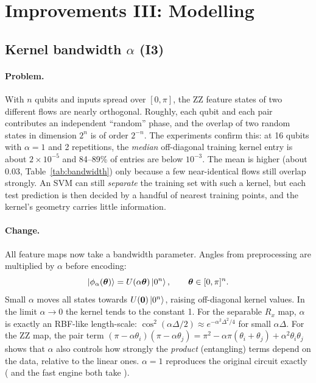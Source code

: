 \section{Improvements III: Modelling}
\label{sec:impmodel}

\subsection{Kernel bandwidth $\alpha$ (I3)}
\paragraph{Problem.} With $n$ qubits and inputs spread over $[0,\pi]$, the ZZ feature states of two
different flows are nearly orthogonal. Roughly, each qubit and each pair contributes an
independent ``random'' phase, and the overlap of two random states in dimension $2^n$ is of order
$2^{-n}$. The experiments confirm this: at 16 qubits with $\alpha=1$ and 2 repetitions, the
\emph{median} off-diagonal training kernel entry is about $2\times10^{-5}$ and 84--89\% of entries
are below $10^{-3}$. The mean is higher (about 0.03, Table~\ref{tab:bandwidth}) only because a
few near-identical flows still overlap strongly. An SVM can still
\emph{separate} the training set with such a kernel, but each test prediction is then decided by
a handful of nearest training points, and the kernel's geometry carries little information.

\paragraph{Change.} All feature maps now take a bandwidth parameter. Angles from preprocessing
are multiplied by $\alpha$ before encoding:
\begin{equation}
\left|\phi_\alpha(\bm\theta)\right\rangle=U(\alpha\bm\theta)\left|0^n\right\rangle,\qquad \bm\theta\in[0,\pi]^n .
\end{equation}
Small $\alpha$ moves all states towards $U(\bm 0)\left|0^n\right\rangle$, raising off-diagonal kernel values.
In the limit $\alpha\to0$ the kernel tends to the constant 1. For the separable $R_x$ map,
$\alpha$ is exactly an RBF-like length-scale: $\cos^2(\alpha\Delta/2)\approx e^{-\alpha^2\Delta^2/4}$
for small $\alpha\Delta$. For the ZZ map, the pair term
$(\pi-\alpha\theta_i)(\pi-\alpha\theta_j)=\pi^2-\alpha\pi(\theta_i+\theta_j)+\alpha^2\theta_i\theta_j$
shows that $\alpha$ also controls how strongly the \emph{product} (entangling) terms depend on the
data, relative to the linear ones. $\alpha=1$ reproduces the original circuit exactly
( and the fast engine both take ).


